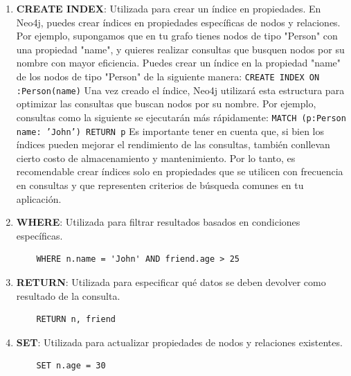 \documentclass[pdflatex,sn-mathphys-num]{sn-jnl}
\theoremstyle{thmstyleone}%
\theoremstyle{thmstyletwo}%
\theoremstyle{thmstylethree}%
\begin{document}
\begin{enumerate}
    \item \textbf{CREATE INDEX}: Utilizada para crear un índice en propiedades. \newline
    En Neo4j, puedes crear índices en propiedades específicas de nodos y relaciones. Por ejemplo, supongamos que en tu grafo tienes nodos de tipo "Person" con una propiedad "name", y quieres realizar consultas que busquen nodos por su nombre con mayor eficiencia. Puedes crear un índice en la propiedad "name" de los nodos de tipo "Person" de la siguiente manera: \newline
    \texttt{CREATE INDEX ON :Person(name)}
    \newline
    Una vez creado el índice, Neo4j utilizará esta estructura para optimizar las consultas que buscan nodos por su nombre. Por ejemplo, consultas como la siguiente se ejecutarán más rápidamente: \newline
    \texttt{MATCH (p:Person {name: 'John'}) RETURN p}
    \newline
    Es importante tener en cuenta que, si bien los índices pueden mejorar el rendimiento de las consultas, también conllevan cierto costo de almacenamiento y mantenimiento. Por lo tanto, es recomendable crear índices solo en propiedades que se utilicen con frecuencia en consultas y que representen criterios de búsqueda comunes en tu aplicación.
    \vspace{0.5cm}
    
    \item \textbf{WHERE}: Utilizada para filtrar resultados basados en condiciones específicas.
    
    \begin{verbatim}
    WHERE n.name = 'John' AND friend.age > 25
    \end{verbatim}

    \vspace{-0.3cm}
    
    \item \textbf{RETURN}: Utilizada para especificar qué datos se deben devolver como resultado de la consulta.
    \begin{verbatim}
    RETURN n, friend
    \end{verbatim}

    \vspace{-0.3cm}
    
    \item \textbf{SET}: Utilizada para actualizar propiedades de nodos y relaciones existentes.
    \begin{verbatim}
    SET n.age = 30
    \end{verbatim}


\end{enumerate}
\end{document}
